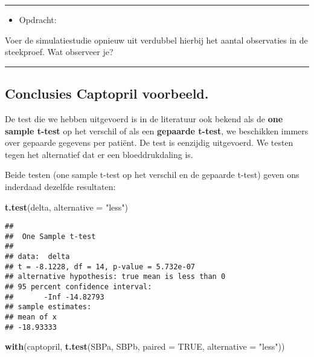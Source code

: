 \documentclass[
  12pt,dutch,coursenotes]{book}
\newenvironment{Shaded}{\begin{snugshade}}{\end{snugshade}}
\newcommand{\DataTypeTok}[1]{\textcolor[rgb]{0.13,0.29,0.53}{#1}}
\newcommand{\KeywordTok}[1]{\textcolor[rgb]{0.13,0.29,0.53}{\textbf{#1}}}
\newcommand{\NormalTok}[1]{#1}
\newcommand{\OtherTok}[1]{\textcolor[rgb]{0.56,0.35,0.01}{#1}}
\newcommand{\StringTok}[1]{\textcolor[rgb]{0.31,0.60,0.02}{#1}}
\providecommand{\tightlist}{%
  \setlength{\itemsep}{0pt}\setlength{\parskip}{0pt}}
\theoremstyle{definition}
\theoremstyle{definition}
\theoremstyle{definition}
\theoremstyle{remark}
\begin{document}
\begin{center}\rule{0.5\linewidth}{0.5pt}\end{center}

\begin{itemize}
\tightlist
\item
  Opdracht:
\end{itemize}

Voer de simulatiestudie opnieuw uit verdubbel hierbij het aantal observaties in de steekproef. Wat observeer je?

\begin{center}\rule{0.5\linewidth}{0.5pt}\end{center}

\hypertarget{conclusies-captopril-voorbeeld.}{%
\subsection{Conclusies Captopril voorbeeld.}\label{conclusies-captopril-voorbeeld.}}

De test die we hebben uitgevoerd is in de literatuur ook bekend als de \textbf{one sample t-test} op het verschil of als een \textbf{gepaarde t-test}, we beschikken immers over gepaarde gegevens per patiënt.
De test is eenzijdig uitgevoerd. We testen tegen het alternatief dat er een bloeddrukdaling is.

Beide testen (one sample t-test op het verschil en de gepaarde t-test) geven ons inderdaad dezelfde resultaten:

\begin{Shaded}
\begin{Highlighting}[]
\KeywordTok{t.test}\NormalTok{(delta, }\DataTypeTok{alternative =} \StringTok{"less"}\NormalTok{)}
\end{Highlighting}
\end{Shaded}

\begin{verbatim}
## 
## 	One Sample t-test
## 
## data:  delta
## t = -8.1228, df = 14, p-value = 5.732e-07
## alternative hypothesis: true mean is less than 0
## 95 percent confidence interval:
##       -Inf -14.82793
## sample estimates:
## mean of x 
## -18.93333
\end{verbatim}

\begin{Shaded}
\begin{Highlighting}[]
\KeywordTok{with}\NormalTok{(captopril, }\KeywordTok{t.test}\NormalTok{(SBPa, SBPb, }\DataTypeTok{paired =} \OtherTok{TRUE}\NormalTok{, }\DataTypeTok{alternative =} \StringTok{"less"}\NormalTok{))}
\end{Highlighting}
\end{Shaded}
\end{document}
